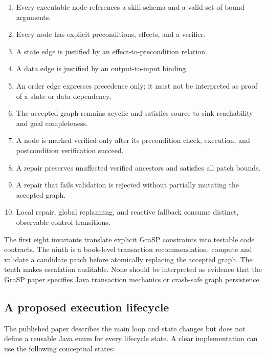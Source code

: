 \begin{enumerate}
  \item Every executable node references a skill schema and a valid set of bound arguments.
  \item Every node has explicit preconditions, effects, and a verifier.
  \item A state edge is justified by an effect-to-precondition relation.
  \item A data edge is justified by an output-to-input binding.
  \item An order edge expresses precedence only; it must not be interpreted as proof of a state or data dependency.
  \item The accepted graph remains acyclic and satisfies source-to-sink reachability and goal completeness.
  \item A node is marked verified only after its precondition check, execution, and postcondition verification succeed.
  \item A repair preserves unaffected verified ancestors and satisfies all patch bounds.
  \item A repair that fails validation is rejected without partially mutating the accepted graph.
  \item Local repair, global replanning, and reactive fallback consume distinct, observable control transitions.
\end{enumerate}

The first eight invariants translate explicit GraSP constraints into testable code contracts. The ninth is a book-level transaction recommendation: compute and validate a candidate patch before atomically replacing the accepted graph. The tenth makes escalation auditable. None should be interpreted as evidence that the GraSP paper specifies Java transaction mechanics or crash-safe graph persistence.

\subsection{A proposed execution lifecycle}

The published paper describes the main loop and state changes but does not define a reusable Java enum for every lifecycle state. A clear implementation can use the following conceptual states:

